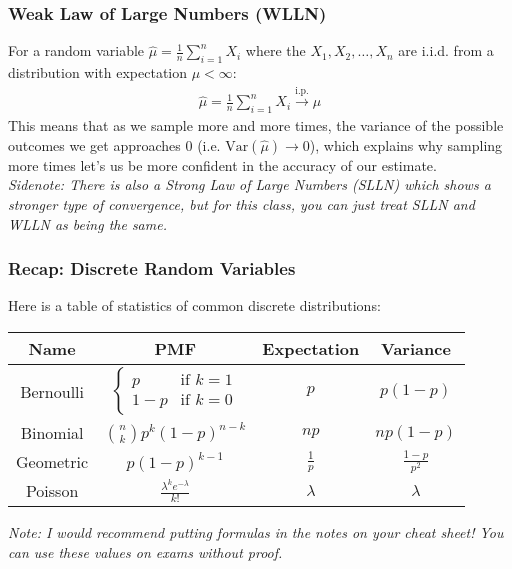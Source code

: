 \documentclass{beamer}
\begin{document}
\begin{frame}
    \frametitle{Weak Law of Large Numbers (WLLN)}
    For a random variable $\hat{\mu}=\frac{1}{n}\sum_{i=1}^nX_i$ where the $X_1,X_2,\dots,X_n$ are i.i.d. from a distribution with expectation $\mu<\infty$:
    \begin{align*}
        \hat{\mu}=\frac{1}{n}\sum_{i=1}^nX_i\xrightarrow{\text{i.p.}}\mu
    \end{align*}
    This means that as we sample more and more times, the variance of the possible outcomes we get approaches $0$ (i.e. $\text{Var}\left(\hat{\mu}\right)\rightarrow 0$), which explains why sampling more times let's us be more confident in the accuracy of our estimate.\\
    {\it Sidenote: There is also a Strong Law of Large Numbers (SLLN) which shows a stronger type of convergence, but for this class, you can just treat SLLN and WLLN as being the same.}
\end{frame}

\begin{frame}
    \frametitle{Recap: Discrete Random Variables}
    Here is a table of statistics of common discrete distributions:
    \begin{center}
        \begin{tabular}{|c|c|c|c|}
            \hline
            Name & PMF & Expectation & Variance \\
            \hline
            Bernoulli & $\begin{cases}p&\text{if }k=1\\1-p&\text{if }k=0\end{cases}$ & $p$ & $p(1-p)$ \\
            Binomial & $\binom{n}{k}p^k(1-p)^{n-k}$ & $np$ & $np(1-p)$ \\
            Geometric & $p(1-p)^{k-1}$ & $\frac{1}{p}$ & $\frac{1-p}{p^2}$ \\
            Poisson & $\frac{\lambda^ke^{-\lambda}}{k!}$ & $\lambda$ & $\lambda$ \\
            \hline 
        \end{tabular}
    \end{center}
    {\it Note: I would recommend putting formulas in the notes on your cheat sheet! You can use these values on exams without proof.}
\end{frame}
\end{document}
